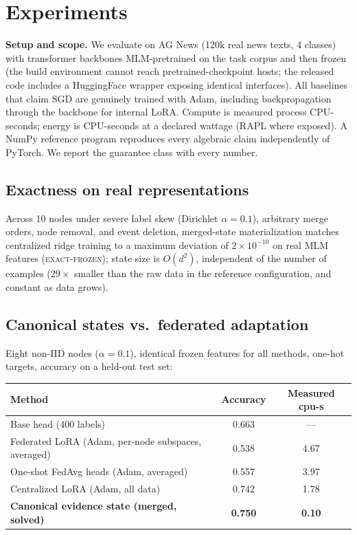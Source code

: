\documentclass[11pt]{article}
\begin{document}
\section{Experiments}\label{sec:exp}

\textbf{Setup and scope.} We evaluate on AG News \citep{zhang2015}
(120k real news texts, 4 classes) with transformer backbones
MLM-pretrained on the task corpus and then frozen (the build environment
cannot reach pretrained-checkpoint hosts; the released code includes a
HuggingFace wrapper exposing identical interfaces). All baselines that
claim SGD are genuinely trained with Adam, including backpropagation
through the backbone for internal LoRA. Compute is measured process
CPU-seconds; energy is CPU-seconds at a declared wattage (RAPL where
exposed). A NumPy reference program reproduces every algebraic claim
independently of PyTorch. We report the guarantee class with every
number.

\subsection{Exactness on real representations}
Across 10 nodes under severe label skew (Dirichlet $\alpha{=}0.1$),
arbitrary merge orders, node removal, and event deletion, merged-state
materialization matches centralized ridge training to a maximum
deviation of $2\times10^{-10}$ on real MLM features
(\textsc{exact-frozen}); state size is $O(d^2)$, independent of the
number of examples ($29\times$ smaller than the raw data in the
reference configuration, and constant as data grows).

\subsection{Canonical states vs.\ federated adaptation}\label{sec:exp-fed}
Eight non-IID nodes ($\alpha{=}0.1$), identical frozen features for all
methods, one-hot targets, accuracy on a held-out test set:

\begin{center}
\begin{tabular}{lcc}
\toprule
Method & Accuracy & Measured cpu-s \\
\midrule
Base head (400 labels) & 0.663 & --- \\
Federated LoRA (Adam, per-node subspaces, averaged) & 0.538 & 4.67 \\
One-shot FedAvg heads (Adam, averaged) & 0.557 & 3.97 \\
Centralized LoRA (Adam, all data) & 0.742 & 1.78 \\
\textbf{Canonical evidence state (merged, solved)} & \textbf{0.750} & \textbf{0.10} \\
\bottomrule
\end{tabular}
\end{center}
\end{document}
